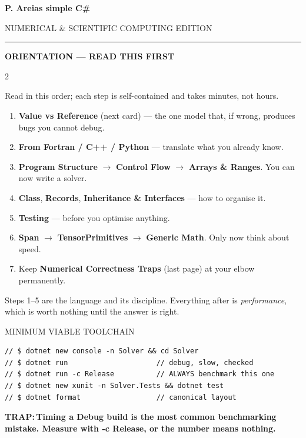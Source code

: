 \documentclass[9pt,a4paper]{extarticle}
\newenvironment{card}[3][acBlue]{%
  \begin{tcolorbox}[
    enhanced, colback=#2, colframe=bdCard,
    coltitle=black, colbacktitle=#2!70!bgHdr,
    fonttitle=\bfseries\fontsize{6.16pt}{7.48pt}\selectfont\MakeUppercase,
    title={#3},
    left=3pt, right=2pt, top=1.4pt, bottom=1.8pt,
    toptitle=1pt, bottomtitle=1pt,
    boxrule=0.4pt,
    borderline west={3pt}{0pt}{#1},
    arc=2pt, before skip=0pt, after skip=1.6mm,
    breakable, toprule at break=0pt, bottomrule at break=0pt,
  ]}{\end{tcolorbox}}
\newcommand{\sectionbanner}[1]{%
  \vspace{0.4mm}%
  {\setlength{\fboxsep}{1.5pt}%
   \colorbox{secBg}{\color{white}\bfseries\fontsize{6.6pt}{7.9pt}\selectfont
   \MakeUppercase{\hspace{0.5mm}#1\hspace{0.5mm}}}%
  }\vspace{1.3mm}\par\nobreak}
\newcommand{\sub}[1]{%
  \par\vspace{1.5pt}%
  {\fontsize{5.7pt}{7pt}\selectfont\color{gray}\MakeUppercase{#1}}\par
  \vspace{0.5pt}}
\newcommand{\code}[1]{{\ttfamily\bfseries #1}}
\newcommand{\trap}[1]{\par\noindent
  \begin{minipage}{\linewidth}%
  {\fontsize{5.6pt}{6.8pt}\selectfont\color{trap}\bfseries TRAP:\,#1}%
  \end{minipage}\par}
\begin{document}

{\centering
{\fontsize{13pt}{15.6pt}\selectfont\bfseries
  P. Areias simple C\#}\par\vspace{0.6mm}
{\fontsize{6.4pt}{7.6pt}\selectfont\color{gray}
  \MakeUppercase{Numerical \& Scientific Computing Edition}}\par\vspace{0.8mm}
{\color{secBg}\rule{\linewidth}{1pt}}\par\vspace{1.5mm}}

\sectionbanner{Orientation --- Read This First}
\begin{multicols}{2}

\begin{card}[acNavy]{bgNavy}{How to Use This Sheet}
{\fontsize{6.0pt}{7.6pt}\selectfont
Read in this order; each step is self-contained and takes minutes, not hours.
\begin{enumerate}[leftmargin=4.2mm,itemsep=0.4pt,topsep=1pt,parsep=0pt]
\item \textbf{Value vs Reference} (next card) --- the one model that, if
  wrong, produces bugs you cannot debug.
\item \textbf{From Fortran / C++ / Python} --- translate what you already know.
\item \textbf{Program Structure} $\rightarrow$ \textbf{Control Flow} $\rightarrow$
  \textbf{Arrays \& Ranges}. You can now write a solver.
\item \textbf{Class}, \textbf{Records}, \textbf{Inheritance \& Interfaces} ---
  how to organise it.
\item \textbf{Testing} --- before you optimise anything.
\item \textbf{Span} $\rightarrow$ \textbf{TensorPrimitives} $\rightarrow$
  \textbf{Generic Math}. Only now think about speed.
\item Keep \textbf{Numerical Correctness Traps} (last page) at your elbow
  permanently.
\end{enumerate}
\vspace{1pt}
Steps 1--5 are the language and its discipline. Everything after is
\emph{performance}, which is worth nothing until the answer is right.}
\sub{Minimum viable toolchain}
\begin{lstlisting}[style=cs]
// $ dotnet new console -n Solver && cd Solver
// $ dotnet run                     // debug, slow, checked
// $ dotnet run -c Release          // ALWAYS benchmark this one
// $ dotnet new xunit -n Solver.Tests && dotnet test
// $ dotnet format                  // canonical layout
\end{lstlisting}
\trap{Timing a Debug build is the most common benchmarking mistake. Measure
with \code{-c Release}, or the number means nothing.}
\end{card}


\end{multicols}
\end{document}
